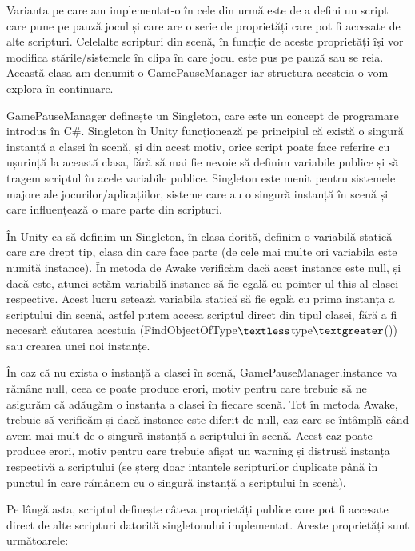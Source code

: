 \documentclass[12pt, a4paper]{article}
\begin{document}
	Varianta pe care am implementat-o în cele din urmă este de a defini un script care pune pe pauză jocul și care are o serie de proprietăți care pot fi accesate de alte scripturi. Celelalte scripturi din scenă, în funcție de aceste proprietăți își vor modifica stările/sistemele în clipa în care jocul este pus pe pauză sau se reia. Această clasa am denumit-o GamePauseManager iar structura acesteia o vom explora în continuare.
	\newline
	
	GamePauseManager definește un Singleton, care este un concept de programare introdus în C\#. Singleton în Unity funcționează pe principiul că există o singură instanță a clasei în scenă, și din acest motiv, orice script poate face referire cu ușurință la această clasa, fără să mai fie nevoie să definim variabile publice și să tragem scriptul în acele variabile publice. Singleton este menit pentru sistemele majore ale jocurilor/aplicațiilor, sisteme care au o singură instanță în scenă și care influențează o mare parte din scripturi. 
	\newline
	
	În Unity ca să definim un Singleton, în clasa dorită, definim o variabilă statică care are drept tip, clasa din care face parte (de cele mai multe ori variabila este numită instance). În metoda de Awake verificăm dacă acest instance este null, și dacă este, atunci setăm variabilă instance să fie egală cu pointer-ul this al clasei respective. Acest lucru setează variabila statică să fie egală cu prima instanța a scriptului din scenă, astfel putem accesa scriptul direct din tipul clasei, fără a fi necesară căutarea acestuia (FindObjectOfType$\textless$type$\textgreater$()) sau crearea unei noi instanțe. 
	\newline
	
	În caz că nu exista o instanță a clasei în scenă, GamePauseManager.instance va rămâne null, ceea ce poate produce erori, motiv pentru care trebuie să ne asigurăm că adăugăm o instanța a clasei în fiecare scenă. Tot în metoda Awake, trebuie să verificăm și dacă instance este diferit de null, caz care se întâmplă când avem mai mult de o singură instanță a scriptului în scenă. Acest caz poate produce erori, motiv pentru care trebuie afișat un warning și distrusă instanța respectivă a scriptului (se șterg doar intantele scripturilor duplicate până în punctul în care rămânem cu o singură instanță a scriptului în scenă).
	\newline
	
	Pe lângă asta, scriptul definește câteva proprietăți publice care pot fi accesate direct de alte scripturi datorită singletonului implementat. Aceste proprietăți sunt următoarele:
	
\end{document}

